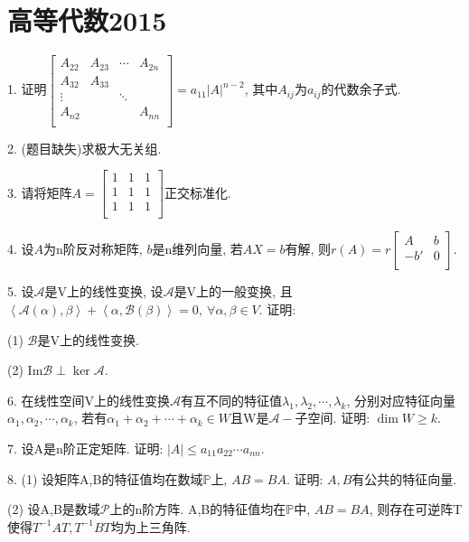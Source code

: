\documentclass[12pt, a4paper, twoside]{ctexart}%
\begin{document}
	\section{高等代数2015}
	1. 证明$\begin{bmatrix}
		A_{22}&A_{23}&\cdots&A_{2n}\\
		A_{32}&A_{33} & & \\
		\vdots& &\ddots & \\
		A_{n2}& & &A_{nn}\\
	\end{bmatrix}=a_{11} |A|^{n-2}$, 其中$A_{ij}$为$a_{ij}$的代数余子式. \par
	2. (题目缺失)求极大无关组. \par
	3. 请将矩阵$A=\begin{bmatrix}
		1&1&1\\
		1&1&1\\
		1&1&1\\
	\end{bmatrix}$正交标准化. \par
	4. 设$A$为n阶反对称矩阵, $b$是n维列向量, 若$AX=b$有解, 则$r(A)=r\begin{bmatrix}
		A&b\\
		-b'&0\\
	\end{bmatrix}.$\par 
	5. 设$\mathscr{A}$是V上的线性变换, 设$\mathscr{A}$是V上的一般变换, 且$\left<\mathscr{A}(\alpha),\beta\right>+\left<\alpha,\mathscr{B}(\beta)\right>=0,\ \forall\alpha,\beta\in V$. 证明: \par
	\hspace{1.2em}(1) $\mathscr{B}$是V上的线性变换. \par
	\hspace{1.2em}(2) $\mathrm{Im} \mathscr{B}\perp \ker \mathscr{A}$.\par 
	6. 在线性空间V上的线性变换$\mathscr{A}$有互不同的特征值$\lambda_1,\lambda_2,\cdots,\lambda_k$, 分别对应特征向量$\alpha_1,\alpha_2,\cdots,\alpha_k$, 若有$\alpha_1+\alpha_2+\cdots+\alpha_k\in W$且W是$\mathscr{A-}$子空间. 证明: $\dim W\ge k.$\par
	7. 设A是n阶正定矩阵. 证明: $|A|\leq a_{11}a_{22}\cdots a_{nn}$.\par
	8. (1) 设矩阵A,B的特征值均在数域$\mathbb{P}$上, $AB=BA$. 证明: $A,B$有公共的特征向量.\par
	\hspace{1.2em}(2) 设A,B是数域$\mathscr{P}$上的n阶方阵. A,B的特征值均在$\mathbb{P}$中, $AB=BA$, 则存在可逆阵T使得$T^{-1}AT,T^{-1}BT$均为上三角阵.\par
	
\end{document}
